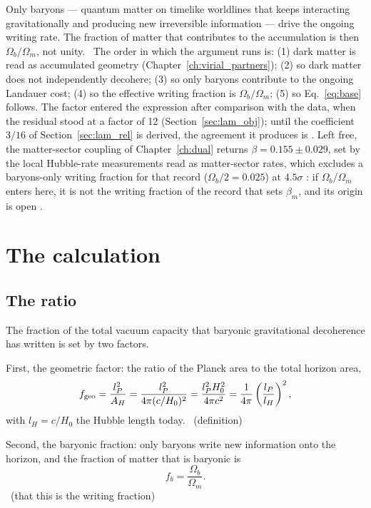 Only baryons --- quantum matter on timelike worldlines that keeps interacting gravitationally and producing new irreversible
information --- drive the ongoing writing rate. The fraction of matter that contributes to the accumulation is then $\Omega_b/\Omega_m$,
not unity. \conjecture\ The order in which the argument runs is: (1) dark matter is read as accumulated geometry
(Chapter~\ref{ch:virial_partners}); (2) so dark matter does not independently decohere; (3) so only baryons contribute to the ongoing
Landauer cost; (4) so the effective writing fraction is $\Omega_b/\Omega_m$; (5) so Eq.~\eqref{eq:base} follows. The factor entered
the expression after comparison with the data, when the residual stood at a factor of 12 (Section~\ref{sec:lam_obj}); until the
coefficient $3/16$ of Section~\ref{sec:lam_rel} is derived, the agreement it produces is \fitted. Left free, the matter-sector coupling of Chapter~\ref{ch:dual} returns $\beta=0.155\pm0.029$, set by the local Hubble-rate measurements read as matter-sector rates, which excludes a baryons-only writing fraction for that record ($\Omega_b/2=0.025$) at $4.5\sigma$ \calc: if $\Omega_b/\Omega_m$ enters here, it is not the writing fraction of the record that sets $\beta_m$, and its origin is open \openprob.

\section{The calculation}\label{sec:lam_calc}
\subsection{The ratio}
The fraction of the total vacuum capacity that baryonic gravitational decoherence has written is set by two factors.

First, the geometric factor: the ratio of the Planck area to the total horizon area,
\begin{equation}
f_{\rm geo}=\frac{l_P^2}{A_H}=\frac{l_P^2}{4\pi(c/H_0)^2}=\frac{l_P^2H_0^2}{4\pi c^2}=\frac{1}{4\pi}\left(\frac{l_P}{l_H}\right)^2,
\label{eq:lam_fgeo}\end{equation}
with $l_H=c/H_0$ the Hubble length today. \derived\ (definition)

Second, the baryonic fraction: only baryons write new information onto the horizon, and the fraction of matter that is baryonic is
\begin{equation}f_b=\frac{\Omega_b}{\Omega_m}.\label{eq:lam_fb}\end{equation}
\conjecture\ (that this is the writing fraction)

